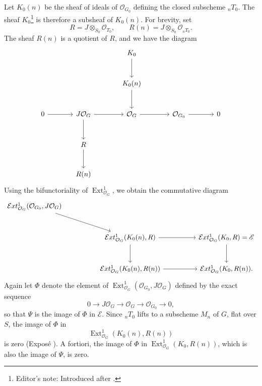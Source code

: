 Let \(K_0(n)\) be the sheaf of ideals of \(\mathcal O_{G_0}\)
defining the closed subscheme \({}_nT_0\). The sheaf
\(K_0\)\footnote{Editor's note: Introduced after .} is
therefore a subsheaf of \(K_0(n)\). For brevity, set
\[
  R=J\otimes_{S_0}\mathcal O_{T_0},
  \qquad
  R(n)=J\otimes_{S_0}\mathcal O_{{}_nT_0}.
\]
The sheaf \(R(n)\) is a quotient of \(R\), and we have the diagram
\[
\begin{tikzcd}[column sep=large,row sep=large]
&& K_0 \arrow[d] \\
&& K_0(n) \arrow[d] \\
0 \arrow[r]
  & J\mathcal O_G \arrow[r] \arrow[d]
  & \mathcal O_G \arrow[r]
  & \mathcal O_{G_0} \arrow[r] & 0 \\
  & R \arrow[d] \\
  & R(n)
\end{tikzcd}
\]
Using the bifunctoriality of
\(\operatorname{Ext}^{1}_{\mathcal O_G}\), we obtain the commutative
diagram
\[
\begin{tikzcd}[column sep=huge,row sep=large]
\mathcal{E}xt^{1}_{\mathcal O_G}
  (\mathcal O_{G_0},J\mathcal O_G)
  \arrow[dr] \\
&
\mathcal{E}xt^{1}_{\mathcal O_G}(K_0(n),R)
  \arrow[r] \arrow[d]
&
\mathcal{E}xt^{1}_{\mathcal O_G}(K_0,R)=\mathscr E
  \arrow[d] \\
&
\mathcal{E}xt^{1}_{\mathcal O_G}(K_0(n),R(n))
  \arrow[r]
&
\mathcal{E}xt^{1}_{\mathcal O_G}(K_0,R(n)).
\end{tikzcd}
\]
Again let \(\Phi\) denote the element of
\(\operatorname{Ext}^{1}_{\mathcal O_G}
(\mathcal O_{G_0},J\mathcal O_G)\) defined by the exact sequence
\[
  0\longrightarrow J\mathcal O_G
  \longrightarrow\mathcal O_G
  \longrightarrow\mathcal O_{G_0}
  \longrightarrow0,
\]
so that \(\Psi\) is the image of \(\Phi\) in \(\mathscr E\). Since
\({}_nT_0\) lifts to a subscheme \(M_n\) of \(G\), flat over \(S\),
the image of \(\Phi\) in
\[
  \operatorname{Ext}^{1}_{\mathcal O_G}(K_0(n),R(n))
\]
is zero (Exposé ). A fortiori, the image of \(\Phi\) in
\(\operatorname{Ext}^{1}_{\mathcal O_G}(K_0,R(n))\), which is also
the image of \(\Psi\), is zero.


